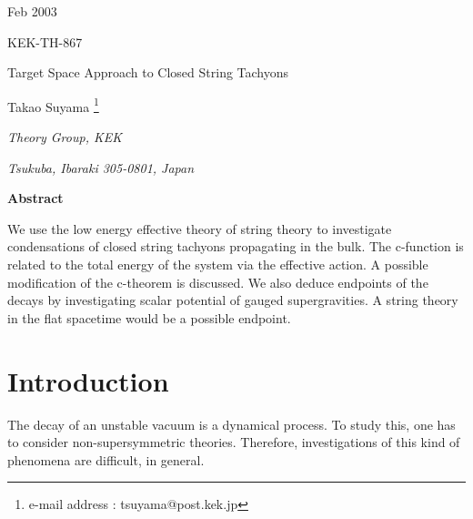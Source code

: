 \documentclass[a4paper,a4paper]{article}
\begin{document}
\begin{flushright}
Feb 2003

KEK-TH-867
\end{flushright}

\begin{center}

\vspace{5cm}

{\Large Target Space Approach to Closed String Tachyons}

\vspace{2cm}

Takao Suyama \footnote{e-mail address : tsuyama@post.kek.jp}

\vspace{1cm}

{\it Theory Group, KEK}

{\it Tsukuba, Ibaraki 305-0801, Japan}

\vspace{4cm}

{\bf Abstract} 

\end{center}

We use the low energy effective theory of string theory to investigate condensations of closed string tachyons 
propagating in the bulk. 
The c-function is related to the total energy of the system via the effective action. 
A possible modification of the c-theorem is discussed. 
We also deduce endpoints of the decays by investigating scalar potential of gauged supergravities. 
A string theory in the flat spacetime would be a possible endpoint. 

\newpage





















\vspace{1cm}

\section{Introduction}

\vspace{5mm}

The decay of an unstable vacuum is a dynamical process. 
To study this, one has to consider non-supersymmetric theories. 
Therefore, investigations of this kind of phenomena are difficult, in general. 
\end{document}
